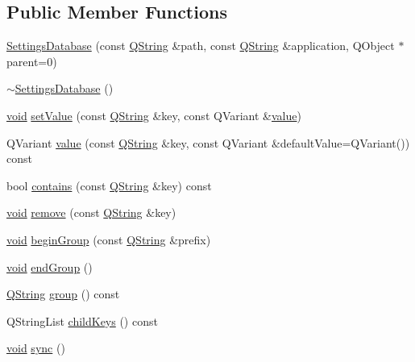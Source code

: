 \subsection*{Public Member Functions}
\begin{DoxyCompactItemize}
\item 
\hyperlink{group___core_plugin_gadfd6819d980e975d9c04d62a1a976854}{Settings\-Database} (const \hyperlink{group___u_a_v_objects_plugin_gab9d252f49c333c94a72f97ce3105a32d}{Q\-String} \&path, const \hyperlink{group___u_a_v_objects_plugin_gab9d252f49c333c94a72f97ce3105a32d}{Q\-String} \&application, Q\-Object $\ast$parent=0)
\item 
\hyperlink{group___core_plugin_ga6e94a52341d1acd5855ecafae93bafe1}{$\sim$\-Settings\-Database} ()
\item 
\hyperlink{group___u_a_v_objects_plugin_ga444cf2ff3f0ecbe028adce838d373f5c}{void} \hyperlink{group___core_plugin_ga6421733fa988f0cbf777c9883cf740bf}{set\-Value} (const \hyperlink{group___u_a_v_objects_plugin_gab9d252f49c333c94a72f97ce3105a32d}{Q\-String} \&key, const Q\-Variant \&\hyperlink{glext_8h_aa0e2e9cea7f208d28acda0480144beb0}{value})
\item 
Q\-Variant \hyperlink{group___core_plugin_ga2403d7e483878cc96312961989a4f313}{value} (const \hyperlink{group___u_a_v_objects_plugin_gab9d252f49c333c94a72f97ce3105a32d}{Q\-String} \&key, const Q\-Variant \&default\-Value=Q\-Variant()) const 
\item 
bool \hyperlink{group___core_plugin_gaedd7b13a933a752c6a8504cae60b0c14}{contains} (const \hyperlink{group___u_a_v_objects_plugin_gab9d252f49c333c94a72f97ce3105a32d}{Q\-String} \&key) const 
\item 
\hyperlink{group___u_a_v_objects_plugin_ga444cf2ff3f0ecbe028adce838d373f5c}{void} \hyperlink{group___core_plugin_gaa8fd610cbfc6d75228f34b6ffebb90f6}{remove} (const \hyperlink{group___u_a_v_objects_plugin_gab9d252f49c333c94a72f97ce3105a32d}{Q\-String} \&key)
\item 
\hyperlink{group___u_a_v_objects_plugin_ga444cf2ff3f0ecbe028adce838d373f5c}{void} \hyperlink{group___core_plugin_gacc3d6f9f4d789e95e35d7191270b785e}{begin\-Group} (const \hyperlink{group___u_a_v_objects_plugin_gab9d252f49c333c94a72f97ce3105a32d}{Q\-String} \&prefix)
\item 
\hyperlink{group___u_a_v_objects_plugin_ga444cf2ff3f0ecbe028adce838d373f5c}{void} \hyperlink{group___core_plugin_ga25d3e7eec0f9a284ab71b851d89787d8}{end\-Group} ()
\item 
\hyperlink{group___u_a_v_objects_plugin_gab9d252f49c333c94a72f97ce3105a32d}{Q\-String} \hyperlink{group___core_plugin_ga30e9f4775fc7a818bbb4222fe8765f39}{group} () const 
\item 
Q\-String\-List \hyperlink{group___core_plugin_gac6824b67c3779827e7e190b0ec57cac1}{child\-Keys} () const 
\item 
\hyperlink{group___u_a_v_objects_plugin_ga444cf2ff3f0ecbe028adce838d373f5c}{void} \hyperlink{group___core_plugin_ga812eb28c2f1d174b967b3e5b020f25c5}{sync} ()
\end{DoxyCompactItemize}



